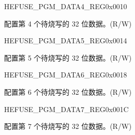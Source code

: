 \begin{register}{H}{EFUSE\_PGM\_DATA4\_REG}{0x0010}\label{regdesc:EFUSEPGMDATA4REG}
%
\regnewline%
\begin{regdesc}\begin{reglist}
\label{fielddesc:EFUSEPGMDATA4}\item [EFUSE\_PGM\_DATA\_4] 配置第 4 个待烧写的 32 位数据。(R/W)
\end{reglist}\end{regdesc}
\end{register}


\begin{register}{H}{EFUSE\_PGM\_DATA5\_REG}{0x0014}\label{regdesc:EFUSEPGMDATA5REG}
%
\regnewline%
\begin{regdesc}\begin{reglist}
\label{fielddesc:EFUSEPGMDATA5}\item [EFUSE\_PGM\_DATA\_5] 配置第 5 个待烧写的 32 位数据。(R/W)
\end{reglist}\end{regdesc}
\end{register}


\begin{register}{H}{EFUSE\_PGM\_DATA6\_REG}{0x0018}\label{regdesc:EFUSEPGMDATA6REG}
%
\regnewline%
\begin{regdesc}\begin{reglist}
\label{fielddesc:EFUSEPGMDATA6}\item [EFUSE\_PGM\_DATA\_6] 配置第 6 个待烧写的 32 位数据。(R/W)
\end{reglist}\end{regdesc}
\end{register}


\begin{register}{H}{EFUSE\_PGM\_DATA7\_REG}{0x001C}\label{regdesc:EFUSEPGMDATA7REG}
%
\regnewline%
\begin{regdesc}\begin{reglist}
\label{fielddesc:EFUSEPGMDATA7}\item [EFUSE\_PGM\_DATA\_7] 配置第 7 个待烧写的 32 位数据。(R/W)
\end{reglist}\end{regdesc}
\end{register}


